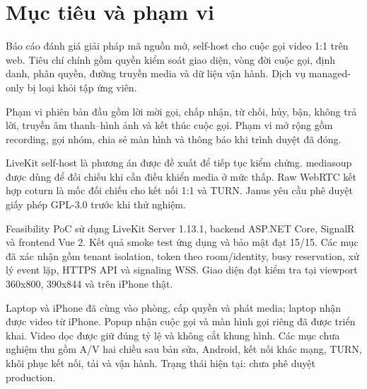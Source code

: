 \section*{Mục tiêu và phạm vi}

Báo cáo đánh giá giải pháp mã nguồn mở, self-host cho cuộc gọi video 1:1 trên web. Tiêu
chí chính gồm quyền kiểm soát giao diện, vòng đời cuộc gọi, định danh, phân quyền, đường
truyền media và dữ liệu vận hành. Dịch vụ managed-only bị loại khỏi tập ứng viên.

Phạm vi phiên bản đầu gồm lời mời gọi, chấp nhận, từ chối, hủy, bận, không trả lời,
truyền âm thanh--hình ảnh và kết thúc cuộc gọi. Phạm vi mở rộng gồm recording, gọi nhóm,
chia sẻ màn hình và thông báo khi trình duyệt đã đóng.

LiveKit self-host là phương án được đề xuất để tiếp tục kiểm chứng.
mediasoup được dùng để đối chiếu khi cần điều khiển media ở mức thấp. Raw WebRTC kết
hợp coturn là mốc đối chiếu cho kết nối 1:1 và TURN. Janus yêu cầu phê duyệt giấy phép
GPL-3.0 trước khi thử nghiệm.

Feasibility PoC sử dụng LiveKit Server 1.13.1, backend ASP.NET Core, SignalR và frontend
Vue 2. Kết quả smoke test ứng dụng và bảo mật đạt 15/15. Các mục đã xác nhận gồm tenant
isolation, token theo room/identity, busy reservation, xử lý event lặp, HTTPS API và
signaling WSS. Giao diện đạt kiểm tra tại viewport 360x800, 390x844 và trên iPhone thật.

Laptop và iPhone đã cùng vào phòng, cấp quyền và phát media; laptop nhận được video từ
iPhone. Popup nhận cuộc gọi và màn hình gọi riêng đã được triển khai. Video dọc được giữ
đúng tỷ lệ và không cắt khung hình. Các mục chưa nghiệm thu gồm A/V hai chiều sau bản
sửa, Android, kết nối khác mạng, TURN, khôi phục kết nối, tải và vận hành. Trạng thái
hiện tại: chưa phê duyệt production.
